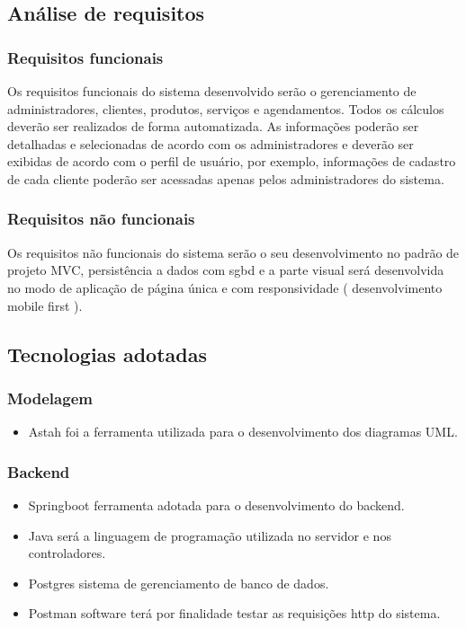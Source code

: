 \subsection{Análise de requisitos}
\subsubsection{Requisitos funcionais}
Os requisitos funcionais do sistema desenvolvido serão o gerenciamento de administradores, clientes, produtos, serviços e agendamentos.
Todos os cálculos deverão ser realizados de forma automatizada.
As informações poderão ser detalhadas e selecionadas de acordo com os administradores e deverão ser exibidas de acordo com o perfil de usuário, por exemplo, informações de cadastro de cada cliente poderão ser acessadas apenas pelos administradores do sistema.
\subsubsection{Requisitos não funcionais}
Os requisitos não funcionais do sistema serão o seu desenvolvimento no padrão de projeto MVC, persistência a dados com sgbd e a parte visual será desenvolvida no modo de aplicação de página única e com responsividade ( desenvolvimento mobile first ).
\subsection{Tecnologias adotadas}
\subsubsection{Modelagem}
\begin{itemize}
	\item Astah foi a ferramenta utilizada para o desenvolvimento dos diagramas UML.
\end{itemize}
\subsubsection{Backend}
\begin{itemize}
	\item Springboot ferramenta adotada para o desenvolvimento do backend.
	\item Java será a linguagem de programação utilizada no servidor e nos controladores.
	\item Postgres sistema de gerenciamento de banco de dados.
	\item Postman software terá por finalidade testar as requisições http do sistema.
\end{itemize}
